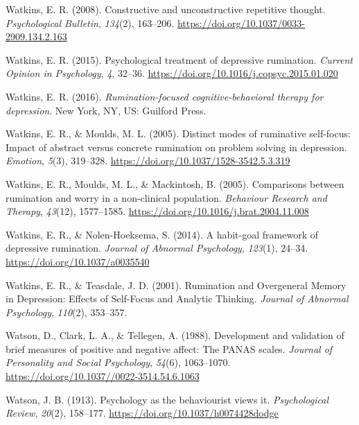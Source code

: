 \documentclass[a4paper,12pt,twoside,openright,oldfontcommands]{memoir}
\begin{document}
\leavevmode\hypertarget{ref-Watkins2008}{}%
Watkins, E. R. (2008). Constructive and unconstructive repetitive thought. \emph{Psychological Bulletin}, \emph{134}(2), 163--206. \url{https://doi.org/10.1037/0033-2909.134.2.163}

\leavevmode\hypertarget{ref-watkins_psychological_2015}{}%
Watkins, E. R. (2015). Psychological treatment of depressive rumination. \emph{Current Opinion in Psychology}, \emph{4}, 32--36. \url{https://doi.org/10.1016/j.copsyc.2015.01.020}

\leavevmode\hypertarget{ref-watkins_rumination-focused_2016}{}%
Watkins, E. R. (2016). \emph{Rumination-focused cognitive-behavioral therapy for depression}. New York, NY, US: Guilford Press.

\leavevmode\hypertarget{ref-watkins_distinct_2005}{}%
Watkins, E. R., \& Moulds, M. L. (2005). Distinct modes of ruminative self-focus: Impact of abstract versus concrete rumination on problem solving in depression. \emph{Emotion}, \emph{5}(3), 319--328. \url{https://doi.org/10.1037/1528-3542.5.3.319}

\leavevmode\hypertarget{ref-watkins_comparisons_2005}{}%
Watkins, E. R., Moulds, M. L., \& Mackintosh, B. (2005). Comparisons between rumination and worry in a non-clinical population. \emph{Behaviour Research and Therapy}, \emph{43}(12), 1577--1585. \url{https://doi.org/10.1016/j.brat.2004.11.008}

\leavevmode\hypertarget{ref-watkins_habit-goal_2014}{}%
Watkins, E. R., \& Nolen-Hoeksema, S. (2014). A habit-goal framework of depressive rumination. \emph{Journal of Abnormal Psychology}, \emph{123}(1), 24--34. \url{https://doi.org/10.1037/a0035540}

\leavevmode\hypertarget{ref-watkins_rumination_2001}{}%
Watkins, E. R., \& Teasdale, J. D. (2001). Rumination and Overgeneral Memory in Depression: Effects of Self-Focus and Analytic Thinking. \emph{Journal of Abnormal Psychology}, \emph{110}(2), 353--357.

\leavevmode\hypertarget{ref-watson_development_1988}{}%
Watson, D., Clark, L. A., \& Tellegen, A. (1988). Development and validation of brief measures of positive and negative affect: The PANAS scales. \emph{Journal of Personality and Social Psychology}, \emph{54}(6), 1063--1070. \url{https://doi.org/10.1037//0022-3514.54.6.1063}

\leavevmode\hypertarget{ref-watson_psychology_1913}{}%
Watson, J. B. (1913). Psychology as the behaviourist views it. \emph{Psychological Review}, \emph{20}(2), 158--177. \url{https://doi.org/10.1037/h0074428dodge}
\end{document}
